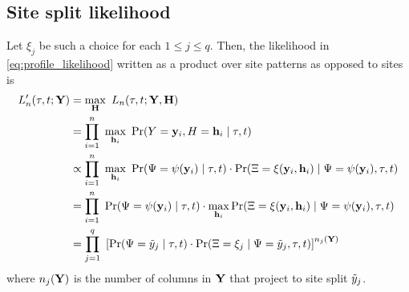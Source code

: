\subsection*{Site split likelihood}

Let $\xi_j$ be such a choice for each $1 \leq j \leq q$.
Then, the likelihood in \eqref{eq:profile_likelihood} written as a product over site patterns as opposed to sites is
\begin{align}
L_\nCols'(\tau, t; \fullAlignment) &= \max_{\fullAncestralStates} \ L_\nCols(\tau, t; \fullAlignment, \fullAncestralStates) \nonumber \\
                             &= \prod_{i=1}^{\nCols} \ \max_{\ancestralStateColumn_i} \ \Pr(\alignmentColumnRV=\alignmentColumn_i, \ancestralStateColumnRV=\ancestralStateColumn_i \mid \tau, t) \nonumber \\
                             &\propto \prod_{i=1}^{\nCols} \ \max_{\ancestralStateColumn_i} \ \Pr(\siteSplitRV=\patternToSplit(\alignmentColumn_i) \mid \tau, t) \cdot \Pr(\ancestralSplitRV=\ancestralToSplit(\alignmentColumn_i, \ancestralStateColumn_i) \mid \siteSplitRV=\patternToSplit(\alignmentColumn_i), \tau, t) \nonumber \\
                             &= \prod_{i=1}^{\nCols} \ \Pr(\siteSplitRV=\patternToSplit(\alignmentColumn_i) \mid \tau, t) \cdot \max_{\ancestralStateColumn_i} \Pr(\ancestralSplitRV=\ancestralToSplit(\alignmentColumn_i, \ancestralStateColumn_i) \mid \siteSplitRV=\patternToSplit(\alignmentColumn_i), \tau, t) \nonumber \\
                             &= \prod_{j=1}^{\nSiteSplits} \ \left[\Pr(\siteSplitRV=\siteSplit_j \mid \tau, t)\cdot \Pr(\ancestralSplitRV=\xi_j \mid \siteSplitRV=\siteSplit_j, \tau, t)\right] ^{\nCols_j(\fullAlignment)} \label{eq:site_pattern_likelihood}
\end{align}
where $n_j(\mathbf{Y})$ is the number of columns in $\mathbf{Y}$ that project to site split $\tilde{y}_j$.

